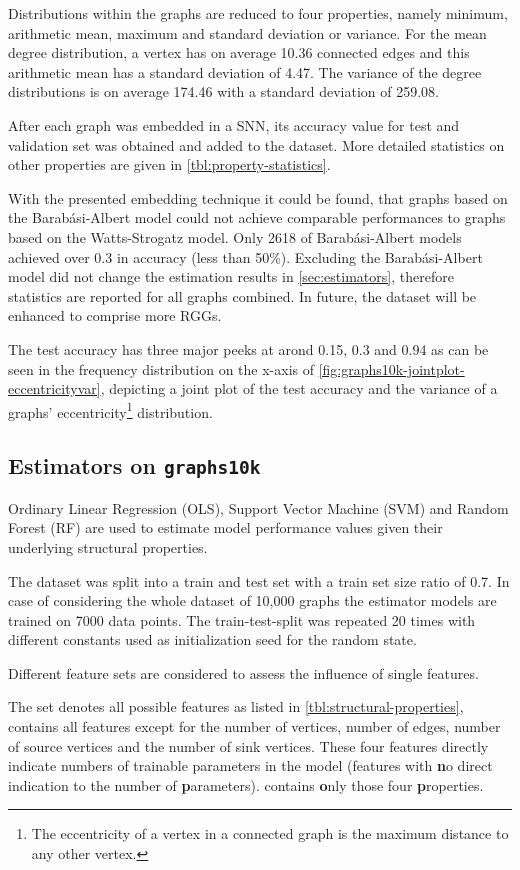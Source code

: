 \documentclass[runningheads]{llncs}
\begin{document}
Distributions within the graphs are reduced to four properties, namely minimum, arithmetic mean, maximum and standard deviation or variance.
For the mean degree distribution, a vertex has on average 10.36 connected edges and this arithmetic mean has a standard deviation of 4.47.
The variance of the degree distributions is on average 174.46 with a standard deviation of 259.08.

After each graph was embedded in a SNN, its accuracy value for test and validation set was obtained and added to the dataset.
More detailed statistics on other properties are given in \autoref{tbl:property-statistics}.

With the presented embedding technique it could be found, that graphs based on the Barabási-Albert model could not achieve comparable performances to graphs based on the Watts-Strogatz model.
Only 2618 of Barabási-Albert models achieved over 0.3 in accuracy (less than 50\%).
Excluding the Barabási-Albert model did not change the estimation results in \autoref{sec:estimators}, therefore statistics are reported for all graphs combined.
In future, the dataset will be enhanced to comprise more RGGs.

The test accuracy has three major peeks at arond 0.15, 0.3 and 0.94 as can be seen in the frequency distribution on the x-axis of \autoref{fig:graphs10k-jointplot-eccentricityvar}, depicting a joint plot of the test accuracy and the variance of a graphs' eccentricity\footnote{The eccentricity of a vertex in a connected graph is the maximum distance to any other vertex.} distribution.


\subsection{Estimators on \texttt{graphs10k}}\label{sec:estimators}
Ordinary Linear Regression (OLS), Support Vector Machine (SVM) and Random Forest (RF) are used to estimate model performance values given their underlying structural properties.

The dataset was split into a train and test set with a train set size ratio of 0.7.
In case of considering the whole dataset of 10,000 graphs the estimator models are trained on 7000 data points.
The train-test-split was repeated 20 times with different constants used as initialization seed for the random state.

Different feature sets are considered to assess the influence of single features.

The set  denotes all possible features as listed in \autoref{tbl:structural-properties},  contains all features except for the number of vertices, number of edges, number of source vertices and the number of sink vertices.
These four features directly indicate numbers of trainable parameters in the model (features with \textbf{n}o direct indication to the number of \textbf{p}arameters).
 contains \textbf{o}nly those four \textbf{p}roperties.
\end{document}
